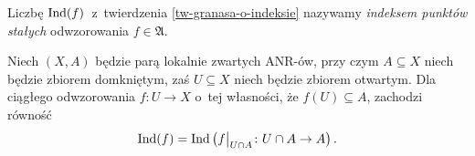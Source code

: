 Liczbę $\operatorname{Ind}(f)$~z~twierdzenia \ref{tw-granasa-o-indeksie} nazywamy \textit{indeksem punktów stałych} odwzorowania $f\in\mathfrak{A}$. 

\begin{lem}\label{wlasnosc_viii}
Niech $(X,A)$ będzie parą lokalnie zwartych ANR-ów, przy czym $A\subseteq X$ niech będzie zbiorem domkniętym, zaś $U\subseteq X$ niech będzie zbiorem otwartym. Dla ciągłego odwzorowania $f\colon U\to X$ o~tej własności, że $f(U)\subseteq A$, zachodzi równość \[\operatorname{Ind}(f)=\operatorname{Ind}\left(f\big |_{U\cap A}\colon U\cap A\to A\right).\] 
\end{lem}

